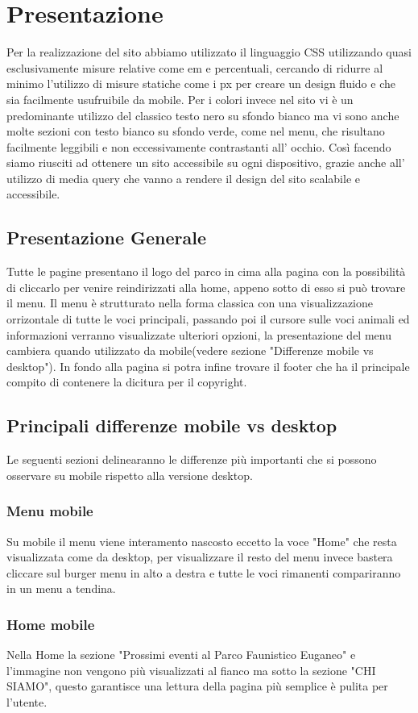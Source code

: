 \section{Presentazione}
    Per la realizzazione del sito abbiamo utilizzato il linguaggio CSS utilizzando quasi esclusivamente misure  relative come em e percentuali, cercando di ridurre al minimo l'utilizzo di misure statiche come i px per creare un design fluido e che sia facilmente usufruibile da mobile.
    Per i colori invece nel sito vi è un predominante utilizzo del classico testo nero su sfondo bianco ma vi sono anche molte sezioni con testo bianco su sfondo verde, come nel menu, che risultano facilmente leggibili e non eccessivamente contrastanti all' occhio.
    Così facendo siamo riusciti ad ottenere un sito accessibile su ogni dispositivo, grazie anche all' utilizzo di media query che vanno a rendere il design del sito scalabile e accessibile.
    
    \subsection{Presentazione Generale}
    Tutte le pagine presentano il logo del parco in cima alla pagina con la possibilità di cliccarlo per venire reindirizzati alla home, appeno sotto di esso si può trovare il menu. Il menu è strutturato nella forma classica con una visualizzazione orrizontale di tutte le voci principali, passando poi il cursore sulle voci animali ed informazioni verranno visualizzate ulteriori opzioni, la presentazione del menu cambiera quando utilizzato da mobile(vedere sezione "Differenze mobile vs desktop"). In fondo alla pagina si potra infine trovare il footer che ha il principale compito di contenere la dicitura per il copyright.

    \subsection{Principali differenze mobile vs desktop}
    Le seguenti sezioni delinearanno le differenze più importanti che si possono osservare su mobile rispetto alla versione desktop.

    \subsubsection{Menu mobile}
    Su mobile il menu viene interamento nascosto eccetto la voce "Home" che resta visualizzata come da desktop, per visualizzare il resto del menu invece bastera cliccare sul burger menu in alto a destra e tutte le voci rimanenti compariranno in un menu a tendina.

    \subsubsection{Home mobile}
    Nella Home la sezione "Prossimi eventi al Parco Faunistico Euganeo" e l'immagine non vengono più visualizzati al fianco ma sotto la sezione "CHI SIAMO", questo garantisce una lettura della pagina più semplice è pulita per l'utente.	   
\pagebreak